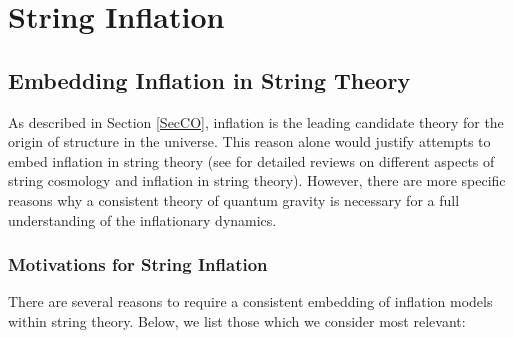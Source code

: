 \section{String Inflation}
\label{sec:Sinfla}

\subsection{Embedding Inflation in String Theory}

As described in Section \ref{SecCO}, inflation is the leading candidate theory for the origin of structure in the universe. This reason alone would justify attempts to embed inflation in string theory (see \cite{Quevedo:2002xw,Kallosh:2007ig,Burgess:2004jk,Burgess:2006nod,Burgess:2006uv,Cline:2006hu,HenryTye:2006uv,McAllister:2007bg,Copeland:2011dx,Cicoli:2011zz,Burgess:2011fa, Yamaguchi:2011kg, Burgess:2013sla,Baumann:2014nda,Silverstein:2016ggb,Nastase:2019mhe} for detailed reviews on different aspects of string cosmology and inflation in string theory). However, there are more specific reasons why a consistent theory of quantum gravity is necessary for a full understanding of the inflationary dynamics.

\subsubsection{Motivations for String Inflation}

There are several reasons to require a consistent embedding of inflation models within 
string theory. Below, we list those which we consider most relevant: 

